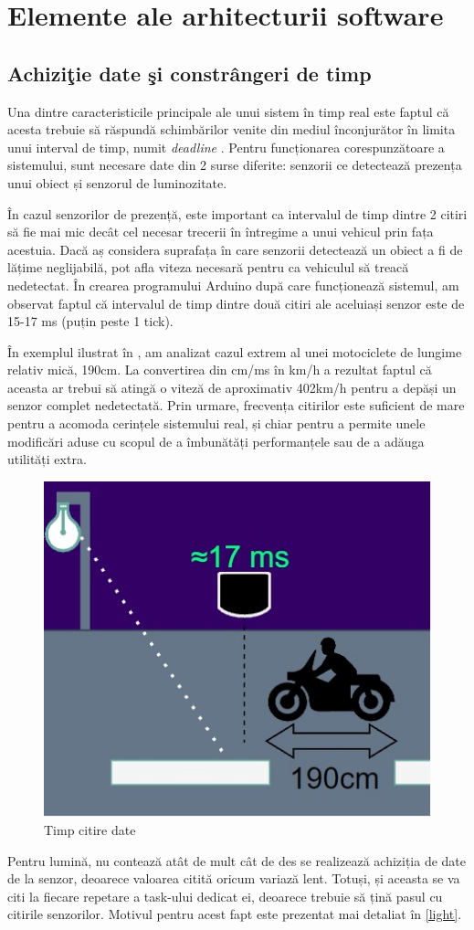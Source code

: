 \chapter{Elemente ale arhitecturii software}
\label{chap:soft}

\section{Achizi\c{t}ie date \c{s}i constr\^{a}ngeri de timp} \label{time}

Una dintre caracteristicile principale ale unui sistem în timp real este faptul că acesta trebuie să răspundă schimbărilor venite din mediul înconjurător în limita unui interval de timp, numit \emph{deadline} \cite{str}. Pentru funcționarea corespunzătoare a sistemului, sunt necesare date din 2 surse diferite: senzorii ce detectează prezența unui obiect și senzorul de luminozitate. 

În cazul senzorilor de prezență, este important ca intervalul de timp dintre 2 citiri să fie mai mic decât cel necesar trecerii în întregime a unui vehicul prin fața acestuia. Dacă aș considera suprafața în care senzorii detectează un obiect a fi de lățime neglijabilă,  pot afla viteza necesară pentru ca vehiculul să treacă nedetectat. În crearea programului Arduino după care funcționează sistemul, am observat faptul că intervalul de timp dintre două citiri ale aceluiași senzor este de 15-17 ms (puțin peste 1 tick). 

În exemplul ilustrat în , am analizat cazul extrem al unei motociclete de lungime relativ mică, 190cm. La convertirea din cm/ms în km/h a rezultat faptul că aceasta ar trebui să atingă o viteză de aproximativ 402km/h pentru a depăși un senzor complet nedetectată.  Prin urmare, frecvența citirilor este suficient de mare pentru a acomoda cerințele sistemului real, și chiar pentru a permite unele modificări aduse cu scopul de a îmbunătăți performanțele sau de a adăuga utilități extra. 

\begin{figure}[!ht]
    \begin{center}
    \includegraphics[width=0.5\linewidth,keepaspectratio]{pics/cardraw4.jpg}
    \end{center}
    \caption{Timp citire date}
    \label{fig:car4}
\end{figure}
 Pentru lumină, nu contează atât de mult cât de des se realizează achiziția de date de la senzor, deoarece valoarea citită oricum variază lent. Totuși, și aceasta se va citi la fiecare repetare a task-ului dedicat ei, deoarece trebuie să țină pasul cu citirile senzorilor. Motivul pentru acest fapt este prezentat mai detaliat în \ref{light}.

